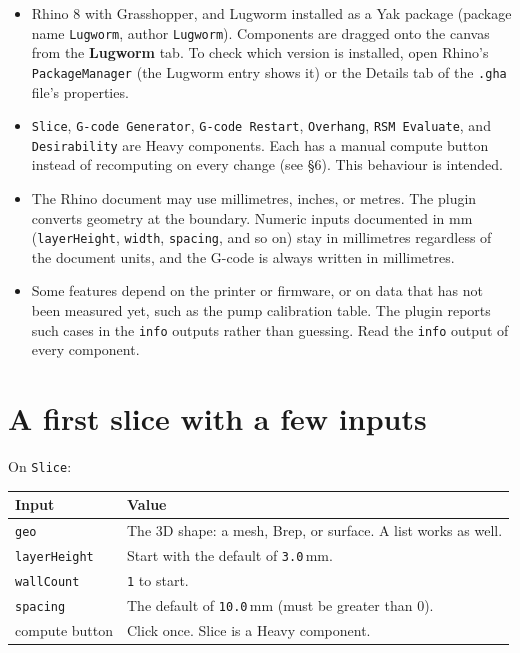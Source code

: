 \documentclass[11pt]{article}
\newcommand{\param}[1]{\texttt{#1}}
\begin{document}
\begin{itemize}
  \item Rhino 8 with Grasshopper, and Lugworm installed as a Yak package (package name \param{Lugworm}, author \param{Lugworm}). Components are dragged onto the canvas from the \textbf{Lugworm} tab. To check which version is installed, open Rhino's \param{PackageManager} (the Lugworm entry shows it) or the Details tab of the \param{.gha} file's properties.
  \item \param{Slice}, \param{G-code Generator}, \param{G-code Restart}, \param{Overhang}, \param{RSM Evaluate}, and \param{Desirability} are Heavy components. Each has a manual compute button instead of recomputing on every change (see \S 6). This behaviour is intended.
  \item The Rhino document may use millimetres, inches, or metres. The plugin converts geometry at the boundary. Numeric inputs documented in mm (\param{layerHeight}, \param{width}, \param{spacing}, and so on) stay in millimetres regardless of the document units, and the G-code is always written in millimetres.
  \item Some features depend on the printer or firmware, or on data that has not been measured yet, such as the pump calibration table. The plugin reports such cases in the \param{info} outputs rather than guessing. Read the \param{info} output of every component.
\end{itemize}

\section{A first slice with a few inputs}

On \param{Slice}:

\begin{longtable}{@{}p{3.0cm}p{9.5cm}@{}}
\toprule
\textbf{Input} & \textbf{Value} \\
\midrule
\endhead
\param{geo} & The 3D shape: a mesh, Brep, or surface. A list works as well. \\
\param{layerHeight} & Start with the default of \param{3.0}\,mm. \\
\param{wallCount} & \param{1} to start. \\
\param{spacing} & The default of \param{10.0}\,mm (must be greater than 0). \\
compute button & Click once. Slice is a Heavy component. \\
\bottomrule
\end{longtable}
\end{document}
